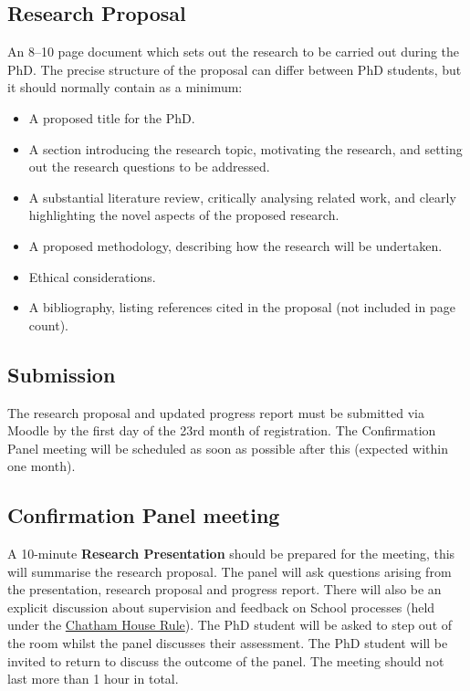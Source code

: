 \documentclass[12pt,a4paper]{article}
\begin{document}
\subsection{Research Proposal}
An 8--10 page document which sets out the research to be carried out during the PhD. The precise structure of the proposal can differ between PhD students, but it should normally contain as a minimum:
\begin{itemize}
	\item A proposed title for the PhD.
	\item A section introducing the research topic, motivating the research, and setting out the research questions to be addressed.
	\item A substantial literature review, critically analysing related work, and clearly highlighting the novel aspects of the proposed research.
	\item A proposed methodology, describing how the research will be undertaken.
	\item Ethical considerations.
	\item A bibliography, listing references cited in the proposal (not included in page count).
\end{itemize}

\subsection{Submission}
The research proposal and updated progress report must be submitted via Moodle by the first day of the 23rd month of registration. The Confirmation Panel meeting will be scheduled as soon as possible after this (expected within one month).

\subsection{Confirmation Panel meeting}
A 10-minute \textbf{Research Presentation} should be prepared for the meeting, this will summarise the research proposal. The panel will ask questions arising from the presentation, research proposal and progress report. There will also be an explicit discussion about supervision and feedback on School processes (held under the \href{https://www.chathamhouse.org/chatham-house-rule}{Chatham House Rule}). The PhD student will be asked to step out of the room whilst the panel discusses their assessment. The PhD student will be invited to return to discuss the outcome of the panel. The meeting should not last more than 1 hour in total.
\end{document}
